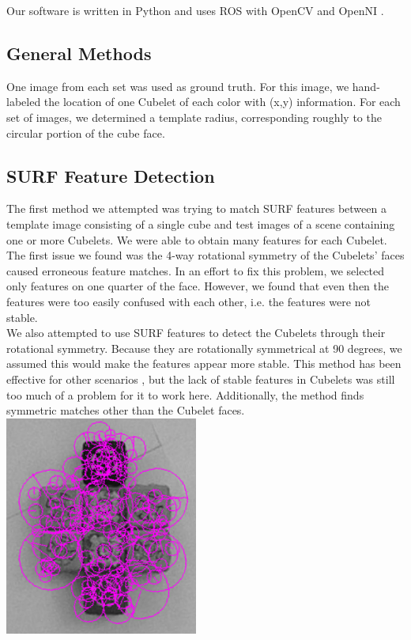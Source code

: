 \documentclass[conference]{IEEEtran}
\begin{document}
Our software is written in Python and uses ROS with OpenCV \cite{OpenCV} and OpenNI \cite{OpenNI}.

\subsection{General Methods}
One image from each set was used as ground truth. For this image, we hand-labeled the location of one Cubelet of each color with (x,y) information. For each set of images, we determined a template radius, corresponding roughly to the circular portion of the cube face.  

\subsection{SURF Feature Detection}
The first method we attempted was trying to match SURF features between a template image consisting of a single cube and test images of a scene containing one or more Cubelets. We were able to obtain many features for each Cubelet. The first issue we found was the 4-way rotational symmetry of the Cubelets' faces caused erroneous feature matches. In an effort to fix this problem, we selected only features on one quarter of the face. However, we found that even then the features were too easily confused with each other, i.e. the features were not stable.\\

We also attempted to use SURF features to detect the Cubelets through their rotational symmetry.  Because they are rotationally symmetrical at 90 degrees, we assumed this would make the features appear more stable. This method has been effective for other scenarios \cite{Loy_Eklundh}, but the lack of stable features in Cubelets was still too much of a problem for it to work here. Additionally, the \cite{Loy_Eklundh} method finds symmetric matches other than the Cubelet faces.\\ 

{\includegraphics[width=2.5in]{surf.png}} \\
\end{document}
